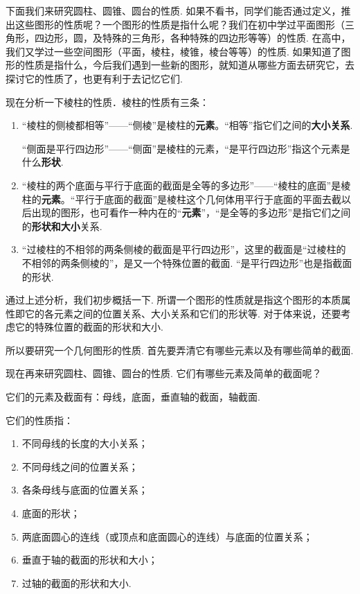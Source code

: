 下面我们来研究圆柱、圆锥、圆台的性质. 如果不看书，同学们能否通过定义，推出这些图形的性质呢？一个图形的性质是指什么呢？我们在初中学过平面图形（三角形，四边形，圆，及特殊的三角形，各种特殊的四边形等等）的性质. 在高中，我们又学过一些空间图形（平面，棱柱，棱锥，棱台等等）的性质. 如果知道了图形的性质是指什么，今后我们遇到一些新的图形，就知道从哪些方面去研究它，去探讨它的性质了，也更有利于去记忆它们.

现在分析一下棱柱的性质．棱柱的性质有三条：
\begin{enumerate}[(1)]
\item “棱柱的侧棱都相等”——“侧棱”是棱柱的\textbf{元素}。“相等”指它们之间的\textbf{大小关系}.

“侧面是平行四边形”——“侧面”是棱柱的元素，“是平行四边形”指这个元素是什么\textbf{形状}.
\item “棱柱的两个底面与平行于底面的截面是全等的多边形”——“棱柱的底面”是棱柱的\textbf{元素}。“平行于底面的截面”是棱柱这个几何体用平行于底面的平面去截以后出现的图形，也可看作一种内在的“\textbf{元素}”，“是全等的多边形”是指它们之间的\textbf{形状和大小}关系.
\item “过棱柱的不相邻的两条侧棱的截面是平行四边形”，这里的截面是“过棱柱的不相邻的两条侧棱的”，是又一个特殊位置的截面. “是平行四边形”也是指截面的形状.
\end{enumerate}

通过上述分析，我们初步概括一下. 所谓一个图形的性质就是指这个图形的本质属性即它的各元素之间的位置关系、大小关系和它们的形状等. 对于体来说，还要考虑它的特殊位置的截面的形状和大小.

所以要研究一个几何图形的性质. 首先要弄清它有哪些元素以及有哪些简单的截面.

现在再来研究圆柱、圆锥、圆台的性质. 它们有哪些元素及简单的截面呢？

它们的元素及截面有：母线，底面，垂直轴的截面，轴截面.

它们的性质指：
\begin{enumerate}
\item 不同母线的长度的大小关系；
\item 不同母线之间的位置关系；
\item 各条母线与底面的位置关系；
\item 底面的形状；
\item 两底面圆心的连线（或顶点和底面圆心的连线）与底面的位置关系；
\item 垂直于轴的截面的形状和大小；
\item 过轴的截面的形状和大小.
\end{enumerate}

